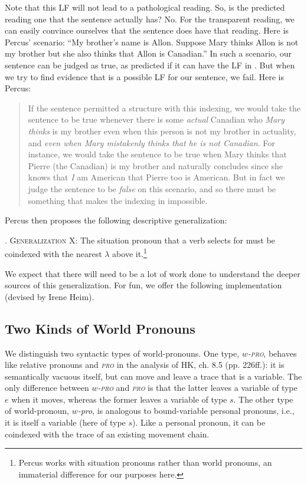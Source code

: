 Note that this LF will not lead to a pathological reading. So, is the predicted reading one that the sentence actually has? No. For the transparent reading, we can easily convince ourselves that the sentence does have that reading. Here is Percus' scenario: ``My brother's name is Allon. Suppose Mary thinks Allon is not my brother but she also thinks that Allon is Canadian.'' In such a scenario, our sentence can be judged as true, as predicted if it can have the LF in \LLast[b]. But when we try to find evidence that \Last is a possible LF for our sentence, we fail. Here is Percus:

\begin{quote}
  If the sentence permitted a structure with this indexing, we would take the sentence to be true whenever there is some \emph{actual} Canadian who \emph{Mary thinks} is my brother \dash even when this person is not my brother in actuality, and \emph{even when Mary mistakenly thinks that he is not Canadian}. For instance, we would take the sentence to be true when Mary thinks that Pierre (the Canadian) is my brother and naturally concludes \dash since she knows that \emph{I} am American \dash that Pierre too is American. But in fact we judge the sentence to be \emph{false} on this scenario, and so there must be something that makes the indexing in \Last impossible. 
\end{quote}
%
Percus then proposes the following descriptive generalization:

\ex. \textsc{Generalization X}: The situation pronoun that a verb selects for must be coindexed with the nearest $\lambda$ above it.\footnote{Percus works with situation pronouns rather than world pronouns, an immaterial difference for our purposes here.}

We expect that there will need to be a lot of work done to understand the deeper sources of this generalization. For fun, we offer the following implementation (devised by Irene Heim).

\subsection{Two Kinds of World Pronouns}

We distinguish two syntactic types of world-pronouns. One type, \emph{$w$-\textsc{pro}}, behaves like relative pronouns and \emph{\textsc{pro}} in the analysis of H\amp K, ch. 8.5 (pp. 226ff.): it is semantically vacuous itself, but can move and leave a trace that is a variable. The only difference between \emph{$w$-\textsc{pro}} and \emph{\textsc{pro}} is that the latter leaves a variable of type $e$ when it moves, whereas the former leaves a variable of type $s$. The other type of world-pronoun, \emph{$w$-pro}, is analogous to bound-variable personal pronouns, i.e., it is itself a variable (here of type $s$). Like a personal pronoun, it can be coindexed with the trace of an existing movement chain.

